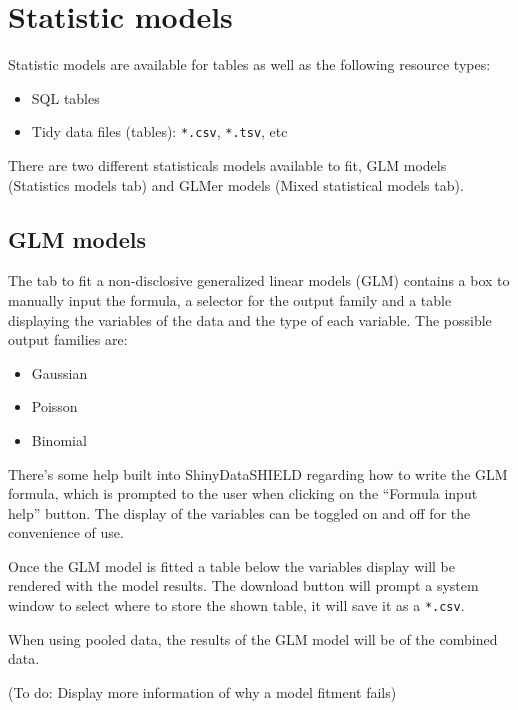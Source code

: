 \documentclass[
]{book}
\providecommand{\tightlist}{%
  \setlength{\itemsep}{0pt}\setlength{\parskip}{0pt}}
\begin{document}
\hypertarget{statistic-models}{%
\section{Statistic models}\label{statistic-models}}

Statistic models are available for tables as well as the following resource types:

\begin{itemize}
\tightlist
\item
  SQL tables
\item
  Tidy data files (tables): \texttt{*.csv}, \texttt{*.tsv}, etc
\end{itemize}

There are two different statisticals models available to fit, GLM models (Statistics models tab) and GLMer models (Mixed statistical models tab).

\hypertarget{glm-models}{%
\subsection{GLM models}\label{glm-models}}

The tab to fit a non-disclosive generalized linear models (GLM) contains a box to manually input the formula, a selector for the output family and a table displaying the variables of the data and the type of each variable. The possible output families are:

\begin{itemize}
\tightlist
\item
  Gaussian
\item
  Poisson
\item
  Binomial
\end{itemize}

There's some help built into ShinyDataSHIELD regarding how to write the GLM formula, which is prompted to the user when clicking on the ``Formula input help'' button. The display of the variables can be toggled on and off for the convenience of use.

Once the GLM model is fitted a table below the variables display will be rendered with the model results. The download button will prompt a system window to select where to store the shown table, it will save it as a \texttt{*.csv}.

When using pooled data, the results of the GLM model will be of the combined data.

(To do: Display more information of why a model fitment fails)
\end{document}
